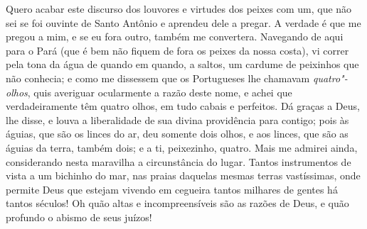 Quero acabar este discurso dos louvores
e virtudes dos peixes com um, que não sei se foi ouvinte de Santo
Antônio e aprendeu dele a pregar. A verdade é que me pregou a mim, e se
eu fora outro, também me convertera. Navegando de aqui para o Pará (que
é bem não fiquem de fora os peixes da nossa costa), vi correr pela tona
da água de quando em quando, a saltos, um cardume de peixinhos que não
conhecia; e como me dissessem que os Portugueses lhe chamavam
\emph{quatro"-olhos}, quis averiguar ocularmente a razão deste nome, e
achei que verdadeiramente têm quatro olhos, em tudo cabais e perfeitos.
Dá graças a Deus, lhe disse, e louva a liberalidade de sua divina
providência para contigo; pois às águias, que são os linces do ar, deu
somente dois olhos, e aos linces, que são as águias da terra, também
dois; e a ti, peixezinho, quatro.
Mais me admirei ainda, considerando nesta maravilha a circunstância do
lugar. Tantos instrumentos de vista a um bichinho do mar, nas praias
daquelas mesmas terras vastíssimas, onde permite Deus que estejam
vivendo em cegueira tantos milhares de gentes há tantos séculos! Oh quão
altas e incompreensíveis são as razões de Deus, e quão profundo o abismo
de seus juízos!

